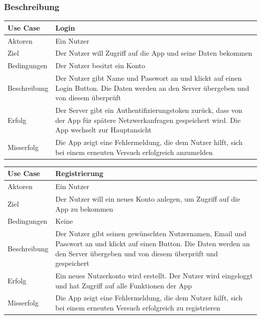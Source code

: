 \subsubsection{Beschreibung}
\begin{tabular}{|p{}|p{}|}
\hline
\textbf{Use Case} & \textbf{Login}  \\ \hline \hline
Aktoren &  Ein Nutzer \\ \hline
Ziel &  Der Nutzer will Zugriff auf die App und seine Daten bekommen \\ \hline
Bedingungen &  Der Nutzer besitzt ein Konto \\ \hline
Beschreibung &  Der Nutzer gibt Name und Passwort an und klickt auf einen Login Button. Die Daten werden an den Server übergeben und von diesem überprüft \\ \hline
Erfolg & Der Server gibt ein Authentifizierungstoken zurück, dass von der App für spätere Netzwerkanfragen gespeichert wird. Die App wechselt zur Hauptansicht  \\ \hline
Misserfolg & Die App zeigt eine Fehlermeldung, die dem Nutzer hilft, sich bei einem erneuten Versuch erfolgreich anzumelden \\ \hline \hline 
\end{tabular}
\begin{tabular}{|p{}|p{}|}
\hline
\textbf{Use Case} & \textbf{Registrierung} \\ \hline \hline
Aktoren &  Ein Nutzer \\  \hline
Ziel &  Der Nutzer will ein neues Konto anlegen, um Zugriff auf die App zu bekommen \\ \hline
Bedingungen &  Keine \\ \hline
Beschreibung &  Der Nutzer gibt seinen gewünschten Nutzernamen, Email und Passwort an und klickt auf einen Button. Die Daten werden an den Server übergeben und von diesem überprüft und gespeichert \\ \hline
Erfolg & Ein neues Nutzerkonto wird erstellt. Der Nutzer wird eingeloggt und hat Zugriff auf alle Funktionen der App \\ \hline
Misserfolg & Die App zeigt eine Fehlermeldung, die dem Nutzer hilft, sich bei einem erneuten Versuch erfolgreich zu registrieren \\ \hline
\hline \end{tabular}
